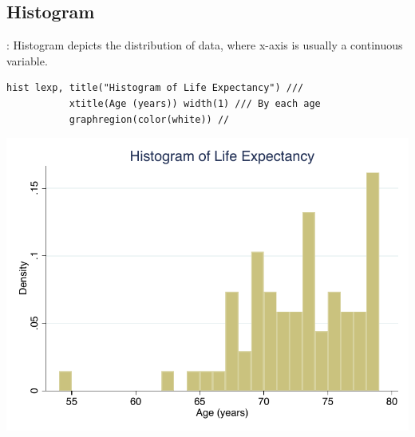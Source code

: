 \subsection{Histogram}
\begin{frame}[fragile]{\secname: \subsecname}
Histogram depicts the distribution of data, where x-axis is usually a continuous variable.
\begin{verbatim}
hist lexp, title("Histogram of Life Expectancy") ///
           xtitle(Age (years)) width(1) /// By each age
           graphregion(color(white)) //	
\end{verbatim}

\begin{center}
	\includegraphics[scale=0.5]{images/hist}
\end{center}

\end{frame}

